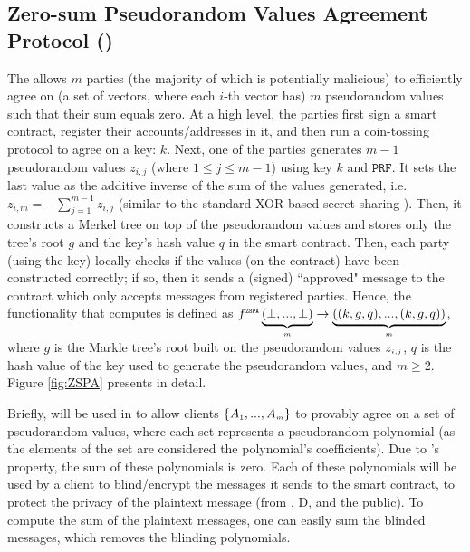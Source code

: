 
\subsection{Zero-sum Pseudorandom Values Agreement Protocol (\zspa)}

The \zspa  allows $m$ parties (the majority of which is potentially malicious) to efficiently agree on (a set of vectors, where each $i$-th vector has) $m$ pseudorandom values such that their sum equals zero. At a high level, the parties first sign a smart contract, register their accounts/addresses in it, and then run a  coin-tossing protocol \ct to agree on a key: $k$.  Next, one of the parties generates $m-1$ pseudorandom values $z_{\scriptscriptstyle i, j}$ (where $1\leq j\leq m-1$) using key $k$ and $\mathtt{PRF}$. It sets the last value as the additive inverse of the sum of the values generated, i.e. $z_{\scriptscriptstyle i, m}=-\sum\limits^{\scriptscriptstyle m-1}_{\scriptscriptstyle j=1}z_{\scriptscriptstyle i, j}$ (similar to the standard XOR-based secret sharing \cite{Schneier0078909}). 
%
%
Then, it constructs a Merkel tree on top of the pseudorandom values and stores only the tree's root $g$ and the key's hash value $q$ in the smart contract.  Then, each party (using the key) locally checks if the values (on the contract) have been constructed correctly; if so, then it sends a (signed) ``approved" message to the contract which only accepts messages from registered parties. Hence, the functionality that \zspa computes is defined as $f^{\scriptscriptstyle \mathtt{ZSPA}}\underbrace{(\bot,..., \bot)}_{\scriptscriptstyle m}\rightarrow \underbrace{((k, g, q),..., (k, g,q))}_{\scriptscriptstyle m}$, where $g$ is the Markle tree's root built on the pseudorandom values $z_{\scriptscriptstyle i, j}$, $q$ is the hash value of the key used to generate the pseudorandom values, and $m\geq 2$. Figure \ref{fig:ZSPA} presents \zspa in detail.  


Briefly, \zspa will be used in \withFai to allow clients $\{A_{\scriptscriptstyle 1},...,A_{\scriptscriptstyle m}\}$ to provably agree on a set of pseudorandom values, where each set represents a pseudorandom polynomial (as the elements of the set are considered the polynomial's coefficients). Due to \zspa's property, the sum of these polynomials is zero.  Each of these polynomials will be used by a client to blind/encrypt the messages it sends to the smart contract, to protect the privacy of the plaintext message (from \aud, D, and the public). To compute the sum of the plaintext messages, one can easily sum the blinded messages, which removes the blinding polynomials. 

